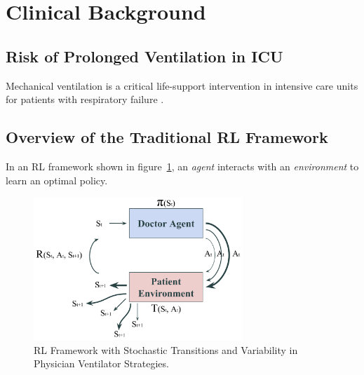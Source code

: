 \section{Clinical Background}
\subsection{Risk of Prolonged Ventilation in ICU}
Mechanical ventilation is a critical life-support intervention in intensive care units for patients with respiratory failure \citep{ref02, ref01}. 

\subsection{Overview of the Traditional RL Framework}
In an RL framework shown in figure~\ref{fig:RL_framework}, an \emph{agent} interacts with an \emph{environment} to learn an optimal policy.

\begin{figure}[htbp]
  \centering
  \includegraphics[width=0.7\textwidth]{figures/RL_framework.png}
  \caption{RL Framework with Stochastic Transitions and Variability in Physician Ventilator Strategies.}
  \label{fig:RL_framework}
\end{figure}